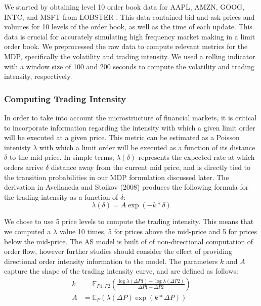 \documentclass[letterpaper, 10 pt, conference]{ieeeconf}  %
\begin{document}
We started by obtaining level 10 order book data for AAPL, AMZN, GOOG, INTC, and MSFT from LOBSTER \cite{c6}. This data contained bid and ask prices and volumes for 10 levels of the order book, as well as the time of each update. This data is crucial for accurately simulating high frequency market making in a limit order book. We preprocessed the raw data to compute relevant metrics for the MDP, specifically the volatility and trading intensity. We used a rolling indicator with a window size of 100 and 200 seconds to compute the volatility and trading intensity, respectively.

\subsubsection{Computing Trading Intensity}

In order to take into account the microstructure of financial markets, it is critical to incorporate information regarding the intensity with which a given limit order will be executed at a given price. This metric can be estimated as a Poisson intenisty $\lambda$ with which a limit order will be executed as a function of its distance $\delta$ to the mid-price. In simple terms, $\lambda(\delta)$ represents the expected rate at which orders arrive $\delta$ distance away from the current mid price, and is directly tied to the transition probabilities in our MDP formulation discussed later. The derivation in Avellaneda and Stoikov (2008) \cite{c5} produces the following formula for the trading intensity as a function of $\delta$: $$\lambda(\delta) = A \exp(-k*\delta)$$ 

We chose to use 5 price levels to compute the trading intensity. This means that we computed a $\lambda$ value 10 times, 5 for prices above the mid-price and 5 for prices below the mid-price. The AS model is built of of non-directional computation of order flow, however further studies should consider the effect of providing directional order intensity information to the model. The parameters $k$ and $A$ capture the shape of the trading intensity curve, and are defined as follows:
\begin{align}
        k &= \mathbb{E}_{P1,P2}\left(\frac{\log \lambda(\Delta P1) - \log \lambda(\Delta P2)}{\Delta P1 - \Delta P2}\right) \\ 
        A &= \mathbb{E}_{P}\left(\lambda(\Delta P)\exp(k*\Delta P)\right)
\end{align}
\end{document}
